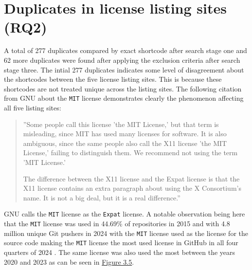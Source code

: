 \section{Duplicates in license listing sites (RQ2)}
A total of 277 duplicates compared by exact shortcode after search stage one and 62 more duplicates were found after applying the exclusion criteria after search stage three. The intial 277 duplicates indicates some level of disagreement about the shortcodes between the five license listing sites. This is because these shortcodes are not treated unique across the listing sites. The following citation from GNU \citep{gnu:licenselist} about the \texttt{MIT} license demonstrates clearly the phenomenon affecting all five listing sites:
\begin{quote}
  ''Some people call this license 'the MIT License,' but that term is misleading, since MIT has used many licenses for software. It is also ambiguous, since the same people also call the X11 license 'the MIT License,' failing to distinguish them. We recommend not using the term 'MIT License.'
  
  The difference between the X11 license and the Expat license is that the X11 license contains an extra paragraph about using the X Consortium's name. It is not a big deal, but it is a real difference.''
\end{quote}
GNU calls the \texttt{MIT} license as the \texttt{Expat} license. A notable observation being here that the \texttt{MIT} license was used in 44.69\% of repositories in 2015 \citep{github:licenseusage} and with 4.8 million unique Git pushers in 2024 with the \texttt{MIT} license used as the license for the source code making the \texttt{MIT} license the most used license in GitHub in all four quarters of 2024 \citep{github:innovation}. The same license was also used the most between the years 2020 and 2023 as can be seen in \hyperref[fig:3-5]{Figure 3.5}.
